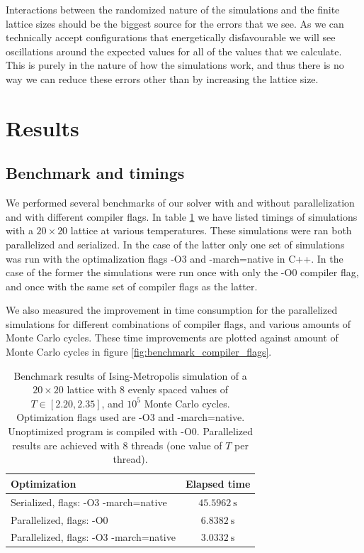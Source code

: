 \documentclass[reprint,english,notitlepage]{revtex4-1}  %
\begin{document}
Interactions between the randomized nature of the simulations and the finite lattice sizes should be the biggest source for the errors that we see. As we can technically accept configurations that energetically disfavourable we will see oscillations around the expected values for all of the values that we calculate. This is purely in the nature of how the simulations work, and thus there is no way we can reduce these errors other than by increasing the lattice size. 



\newpage

\section{Results} \label{sec:IV}

\subsection{Benchmark and timings} \label{sec:IV:A}

We performed several benchmarks of our solver with and without parallelization and with different compiler flags. In table \ref{table:benchmark_parallel} we have listed timings of simulations with a $20 \times 20$ lattice at various temperatures. These simulations were ran both parallelized and serialized. In the case of the latter only one set of simulations was run with the optimalization flags -O3 and -march=native in C++. In the case of the former the simulations were run once with only the -O0 compiler flag, and once with the same set of compiler flags as the latter.

We also measured the improvement in time consumption for the parallelized simulations for different combinations of compiler flags, and various amounts of Monte Carlo cycles. These time improvements are plotted against amount of Monte Carlo cycles in figure \ref{fig:benchmark_compiler_flags}.

\begin{table}[H]
	\centering
	\begin{tabular}{|l|c|}
		\hline
		Optimization & Elapsed time \\
		\hline
		Serialized, flags: -O3 -march=native & \(\SI{45.5962}{\second}\) \\
		Parallelized, flags: -O0 & \(\SI{6.8382}{\second}\) \\
		Parallelized, flags: -O3 -march=native & \(\SI{3.0332}{\second}\) \\
		\hline
	\end{tabular}
	\caption{Benchmark results of Ising-Metropolis simulation of a \(20\times 20\) lattice with \(8\) evenly spaced values of \(T \in [2.20, 2.35]\), and \(10^{5}\) Monte Carlo cycles. Optimization flags used are -O3 and -march=native. Unoptimized program is compiled with -O0. Parallelized results are achieved with \(8\) threads (one value of \(T\) per thread).} \label{table:benchmark_parallel}
\end{table}
\end{document}
